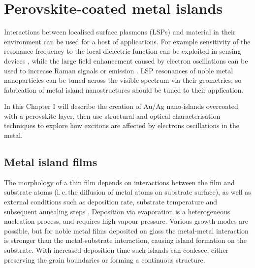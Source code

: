 
\chapter{Perovskite-coated metal islands}

\graphicspath{{Chapter6/Figures/}}

Interactions between localised surface plasmons (LSPs) and material in their environment can be used for a host of applications. For example sensitivity of the resonance frequency to the local dielectric function can be exploited in sensing devices \cite{Jensen2000, Xu2004, Malinsky2001, Royer1987}, while the large field enhancement caused by electron oscillations can be used to increase Raman signals \cite{Cade2009, Olson2001, Talley2005} or emission \cite{Toftegaard2011, Cho2010, Reboud2013, Blanco2004}. LSP resonances of noble metal nanoparticles can be tuned across the visible spectrum via their geometries, so fabrication of metal island nanostructures should be tuned to their application.

In this Chapter I will describe the creation of Au/Ag nano-islands overcoated with a perovskite layer, then use structural and optical characterisation techniques to explore how excitons are affected by electrons oscillations in the metal.

\section{Metal island films}
The morphology of a thin film depends on interactions between the film and substrate atoms (i.\,e.\,the diffusion of metal atoms on substrate surface), as well as external conditions such as deposition rate, substrate temperature and subsequent annealing steps \cite{Kaiser2002}. Deposition via evaporation is a heterogeneous nucleation process, and requires high vapour pressure. Various growth modes are possible, but for noble metal films deposited on glass the metal-metal interaction is stronger than the metal-substrate interaction, causing island formation on the substrate. With increased deposition time such islands can coalesce, either preserving the grain boundaries or forming a continuous structure.

